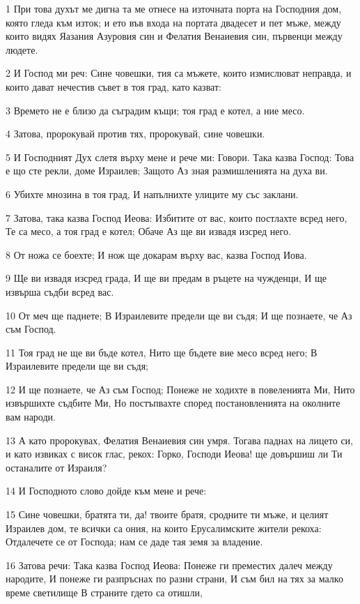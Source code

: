 \par 1 При това духът ме дигна та ме отнесе на източната порта на Господния дом, която гледа към изток; и ето във входа на портата двадесет и пет мъже, между които видях Яазания Азуровия син и Фелатия Венаиевия син, първенци между людете.
\par 2 И Господ ми реч: Сине човешки, тия са мъжете, които измислюват неправда, и които дават нечестив съвет в тоя град, като казват:
\par 3 Времето не е близо да съградим къщи; тоя град е котел, а ние месо.
\par 4 Затова, пророкувай против тях, пророкувай, сине човешки.
\par 5 И Господният Дух слетя върху мене и рече ми: Говори. Така казва Господ: Това е що сте рекли, доме Израилев; Защото Аз зная размишленията на духа ви.
\par 6 Убихте мнозина в тоя град, И напълнихте улиците му със заклани.
\par 7 Затова, така казва Господ Иеова: Избитите от вас, които постлахте всред него, Те са месо, а тоя град е котел; Обаче Аз ще ви извадя изсред него.
\par 8 От ножа се боехте; И нож ще докарам върху вас, казва Господ Иова.
\par 9 Ще ви извадя изсред града, И ще ви предам в ръцете на чужденци, И ще извърша съдби всред вас.
\par 10 От меч ще паднете; В Израилевите предели ще ви съдя; И ще познаете, че Аз съм Господ.
\par 11 Тоя град не ще ви бъде котел, Нито ще бъдете вие месо всред него; В Израилевите предели ще ви съдя;
\par 12 И ще познаете, че Аз съм Господ; Понеже не ходихте в повеленията Ми, Нито извършихте съдбите Ми, Но постъпвахте според постановленията на околните вам народи.
\par 13 А като пророкувах, Фелатия Венаиевия син умря. Тогава паднах на лицето си, и като извиках с висок глас, рекох: Горко, Господи Иеова! ще довършиш ли Ти останалите от Израиля?
\par 14 И Господното слово дойде към мене и рече:
\par 15 Сине човешки, братята ти, да! твоите братя, сродните ти мъже, и целият Израилев дом, те всички са ония, на които Ерусалимските жители рекоха: Отдалечете се от Господа; нам се даде тая земя за владение.
\par 16 Затова речи: Така казва Господ Иеова: Понеже ги преместих далеч между народите, И понеже ги разпръснах по разни страни, И съм бил на тях за малко време светилище В страните гдето са отишли,
